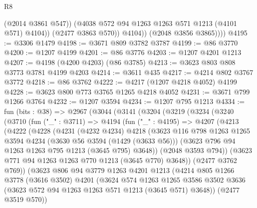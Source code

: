 \begin{lexlean}{R8}
\begin{coremodule}
                    (@2014 @3861 @547))
                  (@4038 @572 @94 @1263 @1263 @571 @1213 (@4101 @571) @4104))
                (@2477 @3863 @570))
              @4104))
          (@2048 @3856 @3865))))
@4195 := @3306 @1479
@4198 := @3671 @809 @3782 @3787
@4199 := @86 @3770
@4200 := @1207 @4199
@4201 := @86 @3776
@4203 := @1207 @4201 @1213
@4207 := @4198 (@4200 @4203) (@86 @3785)
@4213 := @3623 @803 @808 @3773 @3781 @4199 @4203
@4214 := @3611 @435
@4217 := @4214 @802 @3767 @3772
@4218 := @86 @3762
@4222 := @4217 (@1207 @4218 @4052) @4199
@4228 := @3623 @800 @773 @3765 @1265 @4218 @4052
@4231 := @3671 @799 @1266 @3764
@4232 := @1207 @3594
@4234 := @1207 @795 @1213
@4334 := fun (bits : @38) =>
  @2967
    (@3044
      (@3141
        (@3204
          (@3219
            (@3234
              (@3240
                (@3710
                  (fun ("_" : @3711) =>
                  @4194
                    (fun ("_" : @4195) =>
                    @4207
                      (@4213
                        (@4222
                          (@4228
                            (@4231
                              (@4232 @4234)
                              @4218
                              (@3623
                                @116
                                @798
                                @1263
                                @1265
                                @3594
                                @4234
                                (@3630 @56 @3594 (@1429 (@3633 @56)))
                                (@3623 @796 @94 @1263 @1263 @795 @1213 (@3645 @795) @3648))
                              (@2048 @3593 @794))
                            (@3623 @771 @94 @1263 @1263 @770 @1213 (@3645 @770) @3648))
                          (@2477 @3762 @769))
                        (@3623
                          @806
                          @94
                          @3779
                          @1263
                          @4201
                          @1213
                          (@4214
                            @805
                            @1266
                            @3778
                            (@3616 @3502)
                            @4201
                            (@3624
                              @574
                              @1263
                              @1265
                              @3586
                              @3502
                              @3636
                              (@3623 @572 @94 @1263 @1263 @571 @1213 (@3645 @571) @3648))
                            (@2477 @3519 @570))

\end{coremodule}
\end{lexlean}
